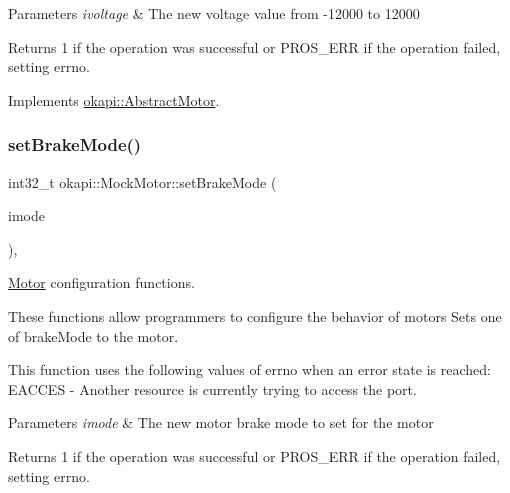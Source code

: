 \begin{DoxyParams}{Parameters}
{\em ivoltage} & The new voltage value from -\/12000 to 12000 \\
\hline
\end{DoxyParams}
\begin{DoxyReturn}{Returns}
1 if the operation was successful or P\+R\+O\+S\+\_\+\+E\+RR if the operation failed, setting errno. 
\end{DoxyReturn}


Implements \mbox{\hyperlink{classokapi_1_1AbstractMotor_a15d12555f527109b046c65fe753d7e20}{okapi\+::\+Abstract\+Motor}}.

\mbox{\label{classokapi_1_1MockMotor_a807d728157563cb1c5afc6eb324d31cc}} 
\subsubsection{\texorpdfstring{setBrakeMode()}{setBrakeMode()}}
{\footnotesize\ttfamily int32\+\_\+t okapi\+::\+Mock\+Motor\+::set\+Brake\+Mode (\begin{DoxyParamCaption}\item[{\mbox{\hyperlink{classokapi_1_1AbstractMotor_a132e0485dbb59a60c3f934338d8fa601}{brake\+Mode}}}]{imode }\end{DoxyParamCaption})\hspace{0.3cm}{\ttfamily [override]}, {\ttfamily [virtual]}}



\mbox{\hyperlink{classokapi_1_1Motor}{Motor}} configuration functions. 

These functions allow programmers to configure the behavior of motors Sets one of brake\+Mode to the motor.

This function uses the following values of errno when an error state is reached\+: E\+A\+C\+C\+ES -\/ Another resource is currently trying to access the port.


\begin{DoxyParams}{Parameters}
{\em imode} & The new motor brake mode to set for the motor \\
\hline
\end{DoxyParams}
\begin{DoxyReturn}{Returns}
1 if the operation was successful or P\+R\+O\+S\+\_\+\+E\+RR if the operation failed, setting errno. 
\end{DoxyReturn}


